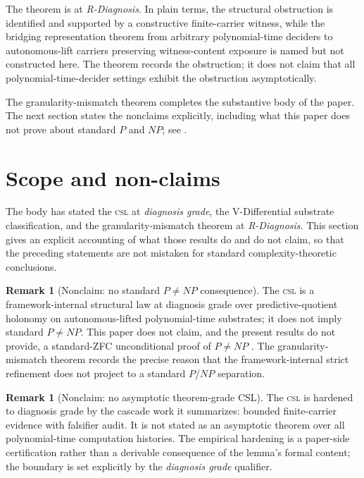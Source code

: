 \documentclass[11pt]{article}
\newcommand{\CSL}{\textsc{csl}}            \newcommand{\CSLcore}{Candidate Structural Law}
\newcommand{\DiagnosisGrade}{\emph{diagnosis grade}}
\newcommand{\RDiagnosis}{\emph{R-Diagnosis}}
\theoremstyle{definition}
\newtheorem{remark}[theorem]{Remark}
\begin{document}
The theorem is at \RDiagnosis{}.  In plain terms, the structural
obstruction is identified and supported by a constructive finite-carrier
witness, while the bridging representation theorem from arbitrary
polynomial-time deciders to autonomous-lift carriers preserving
witness-content exposure is named but not constructed here.  The
theorem records the obstruction; it does not claim that all
polynomial-time-decider settings exhibit the obstruction asymptotically.

The granularity-mismatch theorem completes the substantive body of the
paper.  The next section states the nonclaims explicitly, including
what this paper does not prove about standard \(P\) and \(NP\);
see .
 

\section{Scope and non-claims}
\label{sec:scope}

The body has stated the \CSL{} at \DiagnosisGrade{}, the
V-Differential substrate classification, and the granularity-mismatch
theorem at \RDiagnosis{}.  This section gives an explicit accounting
of what those results do and do not claim, so that the preceding
statements are not mistaken for standard complexity-theoretic
conclusions.

\begin{remark}[Nonclaim: no standard \(P\neq NP\) consequence]
The \CSL{} is a framework-internal structural law at diagnosis grade
over predictive-quotient holonomy on autonomous-lifted polynomial-time
substrates; it does not imply standard \(P\neq NP\).  This paper does
not claim, and the present results do not provide, a standard-ZFC
unconditional proof of \(P\neq NP\)
\citep{Cook2000PNPClay,Fortnow2009StatusPNP}.  The granularity-mismatch
theorem records the precise reason that the framework-internal strict
refinement does not project to a standard \(P\)/\(NP\) separation.
\end{remark}

\begin{remark}[Nonclaim: no asymptotic theorem-grade CSL]
The \CSL{} is hardened to diagnosis grade by the cascade work it
summarizes: bounded finite-carrier evidence with falsifier audit.  It
is not stated as an asymptotic theorem over all polynomial-time
computation histories.  The empirical hardening is a paper-side
certification rather than a derivable consequence of the lemma's formal
content; the boundary is set explicitly by the \DiagnosisGrade{}
qualifier.
\end{remark}
\end{document}
